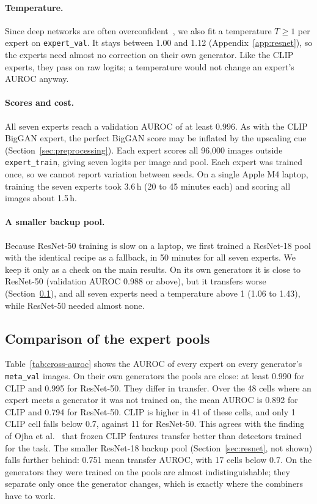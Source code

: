 \documentclass[10pt,a4paper]{article}
\begin{document}
\paragraph{Temperature.}
Since deep networks are often overconfident~\cite{guo2017calibration}, we also fit a temperature $T \geq 1$ per expert on \texttt{expert\_val}. It stays between 1.00 and 1.12 (Appendix~\ref{app:resnet}), so the experts need almost no correction on their own generator. Like the CLIP experts, they pass on raw logits; a temperature would not change an expert's AUROC anyway.

\paragraph{Scores and cost.}
All seven experts reach a validation AUROC of at least 0.996. As with the CLIP BigGAN expert, the perfect BigGAN score may be inflated by the upscaling cue (Section~\ref{sec:preprocessing}). Each expert scores all 96{,}000 images outside \texttt{expert\_train}, giving seven logits per image and pool. Each expert was trained once, so we cannot report variation between seeds. On a single Apple M4 laptop, training the seven experts took 3.6\,h (20 to 45 minutes each) and scoring all images about 1.5\,h.

\paragraph{A smaller backup pool.}
Because ResNet-50 training is slow on a laptop, we first trained a ResNet-18 pool with the identical recipe as a fallback, in 50 minutes for all seven experts. We keep it only as a check on the main results. On its own generators it is close to ResNet-50 (validation AUROC 0.988 or above), but it transfers worse (Section~\ref{sec:pools}), and all seven experts need a temperature above 1 (1.06 to 1.43), while ResNet-50 needed almost none.

\subsection{Comparison of the expert pools}\label{sec:pools}

Table~\ref{tab:cross-auroc} shows the AUROC of every expert on every generator's \texttt{meta\_val} images. On their own generators the pools are close: at least 0.990 for CLIP and 0.995 for ResNet-50. They differ in transfer. Over the 48 cells where an expert meets a generator it was not trained on, the mean AUROC is 0.892 for CLIP and 0.794 for ResNet-50. CLIP is higher in 41 of these cells, and only 1 CLIP cell falls below 0.7, against 11 for ResNet-50. This agrees with the finding of Ojha et al.~\cite{ojha2023universal} that frozen CLIP features transfer better than detectors trained for the task. The smaller ResNet-18 backup pool (Section~\ref{sec:resnet}, not shown) falls further behind: 0.751 mean transfer AUROC, with 17 cells below 0.7. On the generators they were trained on the pools are almost indistinguishable; they separate only once the generator changes, which is exactly where the combiners have to work.
\end{document}
